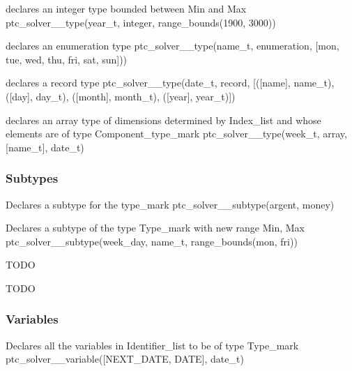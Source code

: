\documentclass{article}
\begin{document}
        {declares an integer type bounded between Min and Max}
        {ptc\_solver\_\_type(year\_t, integer, range\_bounds(1900, 3000))}
        {}

        {declares an enumeration type}
        {ptc\_solver\_\_type(name\_t, enumeration, [mon, tue, wed, thu, fri, sat,
sun]))}
        {}

        {declares a record type}
        {ptc\_solver\_\_type(date\_t, record, [([name], name\_t), ([day],
day\_t),
    ([month], month\_t), ([year], year\_t)])}
        {}

        {declares an array type of dimensions determined by Index\_list and whose
elements
        are of type Component\_type\_mark}
        {ptc\_solver\_\_type(week\_t, array, [name\_t], date\_t)}
        {}

\subsubsection{Subtypes}

\hspace{\parindent}
    {Declares a subtype for the type\_mark}
    {ptc\_solver\_\_subtype(argent, money)}
        {}

        {Declares a subtype of the type Type\_mark with new range Min, Max}
    {ptc\_solver\_\_subtype(week\_day, name\_t, range\_bounds(mon, fri))}
    {}

    {TODO}
    {}
    {}

        {TODO}
        {}
        {}

\subsubsection{Variables}

\hspace{\parindent}
    {Declares all the variables in Identifier\_list to be of type Type\_mark}
    {ptc\_solver\_\_variable([NEXT\_DATE, DATE], date\_t)}
    {}
\end{document}
